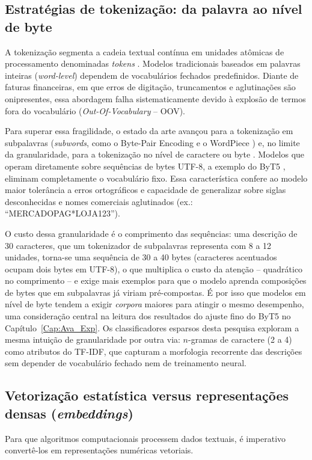 \subsection{Estratégias de tokenização: da palavra ao nível de byte}
\label{sec:fund_tokenizacao}
A tokenização segmenta a cadeia textual contínua em unidades atômicas de processamento denominadas \textit{tokens} \cite{BPLN_livro:2024}. Modelos tradicionais baseados em palavras inteiras (\textit{word-level}) dependem de vocabulários fechados predefinidos. Diante de faturas financeiras, em que erros de digitação, truncamentos e aglutinações são onipresentes, essa abordagem falha sistematicamente devido à explosão de termos fora do vocabulário (\textit{Out-Of-Vocabulary} -- OOV).

Para superar essa fragilidade, o estado da arte avançou para a tokenização em subpalavras (\textit{subwords}, como o Byte-Pair Encoding \cite{sennrich2016bpe} e o WordPiece \cite{schuster2012wordpiece}) e, no limite da granularidade, para a tokenização no nível de caractere ou byte \cite{zhang2015character, xue2021byt5}. Modelos que operam diretamente sobre sequências de bytes UTF-8, a exemplo do ByT5 \cite{xue2021byt5}, eliminam completamente o vocabulário fixo. Essa característica confere ao modelo maior tolerância a erros ortográficos e capacidade de generalizar sobre siglas desconhecidas e nomes comerciais aglutinados (ex.: ``MERCADOPAG*LOJA123'').

O custo dessa granularidade é o comprimento das sequências: uma descrição de 30 caracteres, que um tokenizador de subpalavras representa com 8 a 12 unidades, torna-se uma sequência de 30 a 40 bytes (caracteres acentuados ocupam dois bytes em UTF-8), o que multiplica o custo da atenção -- quadrático no comprimento -- e exige mais exemplos para que o modelo aprenda composições de bytes que em subpalavras já viriam pré-compostas. É por isso que modelos em nível de byte tendem a exigir \textit{corpora} maiores para atingir o mesmo desempenho, uma consideração central na leitura dos resultados do ajuste fino do ByT5 no Capítulo~\ref{Cap:Ava_Exp}. Os classificadores esparsos desta pesquisa exploram a mesma intuição de granularidade por outra via: $n$-gramas de caractere (2 a 4) como atributos do TF-IDF, que capturam a morfologia recorrente das descrições sem depender de vocabulário fechado nem de treinamento neural.

\subsection{Vetorização estatística versus representações densas (\textit{embeddings})}
Para que algoritmos computacionais processem dados textuais, é imperativo convertê-los em representações numéricas vetoriais.


